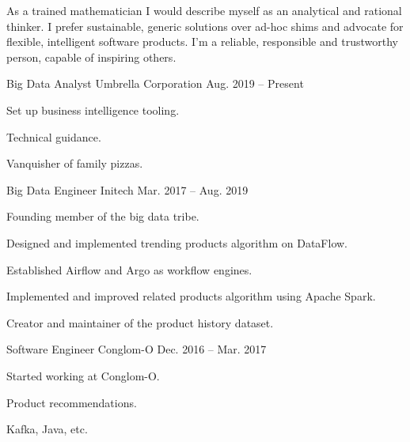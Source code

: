 \documentclass[10pt, a4paper]{customcv}
\begin{document}
  \makecvheader

  \begin{multicols}{2}


  As a trained mathematician I would describe myself as an analytical and rational thinker.
  I prefer sustainable, generic solutions over ad-hoc shims and advocate for flexible, intelligent software products.
  I'm a reliable, responsible and trustworthy person, capable of inspiring others.


  \begin{cventries}

    \cventry
      {Big Data Analyst}
      {Umbrella Corporation}
      {Aug. 2019 – Present}
      {
        \begin{cvitems}
          \item {Set up business intelligence tooling}.
          \item {Technical guidance.}
          \item {Vanquisher of family pizzas.}
        \end{cvitems}
      }

    \cventry
      {Big Data Engineer}
      {Initech}
      {Mar. 2017 – Aug. 2019}
      {
        \begin{cvitems}
          \item {Founding member of the big data tribe.}
          \item {Designed and implemented trending products \newline
                 algorithm on DataFlow.}
          \item {Established Airflow and Argo as workflow engines.}
          \item {Implemented and improved related products \newline
                 algorithm using Apache Spark.}
          \item {Creator and maintainer of the product history dataset.}
        \end{cvitems}
      }

    \cventry
      {Software Engineer}
      {Conglom-O}
      {Dec. 2016 – Mar. 2017}
      {
        \begin{cvitems}
          \item {Started working at Conglom-O.}
          \item {Product recommendations.}
          \item {Kafka, Java, etc.}
        \end{cvitems}
      }


\end{cventries}
\end{multicols}
\end{document}
